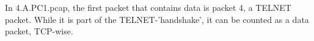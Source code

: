 In 4.A.PC1.pcap, the first packet that contains data is packet 4, a TELNET packet.
While it is part of the TELNET-'handshake', it can be counted as a data packet, TCP-wise.\\
